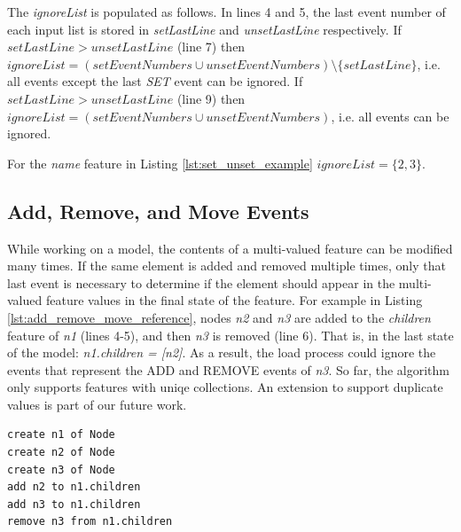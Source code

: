 \documentclass{llncs}
\begin{document}
The \emph{ignoreList} is populated as follows.
In lines 4 and 5, the last event number of each input list is stored in \emph{setLastLine} and \emph{unsetLastLine} respectively.
If $setLastLine > unsetLastLine$ (line 7) then $ignoreList = (setEventNumbers \cup unsetEventNumbers) \setminus  \{setLastLine\} $, i.e. all events except the last \emph{SET} event can be ignored.
If $setLastLine > unsetLastLine$ (line 9) then $ignoreList = (setEventNumbers \cup unsetEventNumbers)$, i.e. all events can be ignored.



For the \emph{name} feature in Listing \ref{lst:set_unset_example} $ignoreList = \{2, 3\}$.


\subsection{Add, Remove, and Move Events}\label{subsec:add_remove_and_move_operations}
While working on a model, the contents of a multi-valued feature can be modified many times.
If the same element is added and removed multiple times,  only that last event is necessary to determine if the element should appear in the multi-valued feature values in the final state of the feature.
For example in Listing \ref{lst:add_remove_move_reference},  nodes \emph{n2} and \emph{n3} are added to the \emph{children} feature of \emph{n1} (lines 4-5), and then \emph{n3} is removed (line 6).
That is, in the last state of the model: \emph{n1.children = [n2]}.
As a result, the load process could ignore the events that represent the ADD and REMOVE events of \emph{n3}. So far, the algorithm only supports features with uniqe collections. An extension to support duplicate values is part of our future work.  

\begin{lstlisting}[style=eol,caption={Example of CBP representation of attribute \emph{values}'s add and remove operations.},label=lst:add_remove_move_reference]
create n1 of Node
create n2 of Node
create n3 of Node
add n2 to n1.children
add n3 to n1.children
remove n3 from n1.children
\end{lstlisting}
\end{document}
